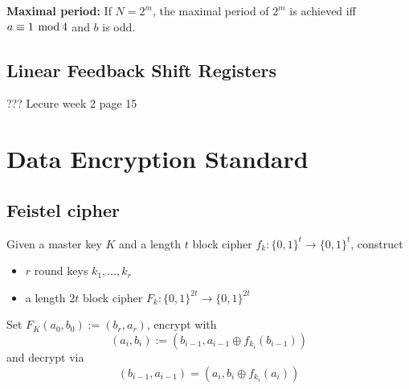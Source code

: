 \documentclass[a4paper]{scrartcl}
\renewcommand\mod{\hspace*{0.4em}\mathrm{mod}\hspace*{0.2em}}
\begin{document}
\textbf{Maximal period:} If $N=2^m$, the maximal period of $2^m$
is achieved iff $a\equiv1\mod4$ and $b$ is odd.

\subsection{Linear Feedback Shift Registers}

??? Lecure week 2 page 15

\section{Data Encryption Standard}

\subsection{Feistel cipher}

Given a master key $K$ and a length $t$ block cipher $f_k:\{0,1\}^t\rightarrow\{0,1\}^t$,
construct \begin{itemize}
    \item $r$ round keys $k_1,\hdots,k_r$
    \item a length $2t$ block cipher $F_k:\{0,1\}^{2t}\rightarrow\{0,1\}^{2t}$
\end{itemize}

Set $F_K(a_0,b_0) := (b_r, a_r)$, encrypt with
\[(a_i,b_i):=(b_{i-1}, a_{i-1}\oplus f_{k_i}(b_{i-1}))\]
and decrypt via
\[(b_{i-1},a_{i-1}) = (a_i,b_i\oplus f_{k_i}(a_i))\]
\end{document}
